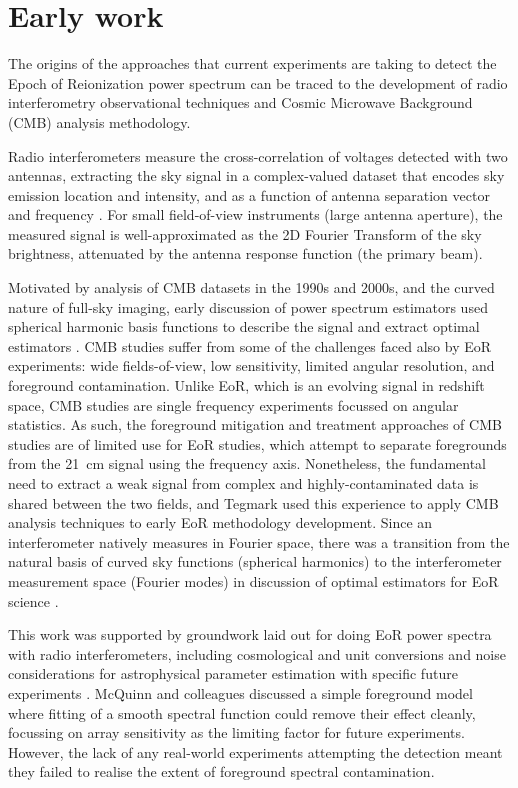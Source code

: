 \section{Early work}
\label{sec:early_work}
The origins of the approaches that current experiments are taking to detect the Epoch of Reionization power spectrum can be traced to the development of radio interferometry observational techniques and Cosmic Microwave Background (CMB) analysis methodology.

Radio interferometers measure the cross-correlation of voltages detected with two antennas, extracting the sky signal in a complex-valued dataset that encodes sky emission location and intensity, and as a function of antenna separation vector and frequency \cite{tms}. For small field-of-view instruments (large antenna aperture), the measured signal is well-approximated as the 2D Fourier Transform of the sky brightness, attenuated by the antenna response function (the primary beam).

Motivated by analysis of CMB datasets in the 1990s and 2000s, and the curved nature of full-sky imaging, early discussion of power spectrum estimators used spherical harmonic basis functions to describe the signal and extract optimal estimators \cite{tegmark97}. CMB studies suffer from some of the challenges faced also by EoR experiments: wide fields-of-view, low sensitivity, limited angular resolution, and foreground contamination. Unlike EoR, which is an evolving signal in redshift space, CMB studies are single frequency experiments focussed on angular statistics. As such, the foreground mitigation and treatment approaches of CMB studies are of limited use for EoR studies, which attempt to separate foregrounds from the 21~cm signal using the frequency axis. Nonetheless, the fundamental need to extract a weak signal from complex and highly-contaminated data is shared between the two fields, and Tegmark used this experience to apply CMB analysis techniques to early EoR methodology development. 
Since an interferometer natively measures in Fourier space, there was a transition from the natural basis of curved sky functions (spherical harmonics) to the interferometer measurement space (Fourier modes) in discussion of optimal estimators for EoR science \cite{liu11}.

This work was supported by groundwork laid out for doing EoR power spectra with radio interferometers, including cosmological and unit conversions \cite{morales04,parsons10} and noise considerations for astrophysical parameter estimation with specific future experiments \cite{mcquinn06}. McQuinn and colleagues discussed a simple foreground model where fitting of a smooth spectral function could remove their effect cleanly, focussing on array sensitivity as the limiting factor for future experiments. 
However, the lack of any real-world experiments attempting the detection meant they failed to realise the extent of foreground spectral contamination.

